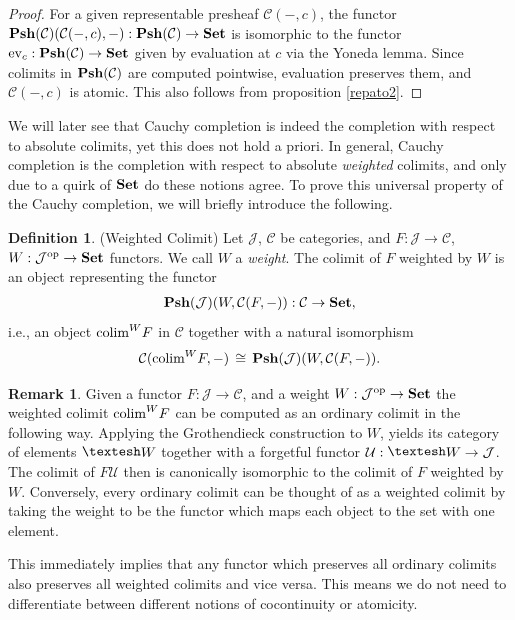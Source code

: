 \documentclass[12pt,oneside,reqno,a4paper]{article}
\theoremstyle{definition}
\newtheorem{definition}[theorem]{Definition}
\newtheorem{remark}[theorem]{Remark}
\newcommand{\esh}{\textup{\raisebox{1pt}\textesh}}
\newcommand{\op}{^\textup{op}}
\newcommand{\Set}{\textbf{\textup{Set}}}
\newcommand{\Psh}[1]{\textbf{\textup{Psh}}(#1)}
\newcommand{\iso}{\,\cong\,}
\newcommand{\C}{\mathcal{C}}
\newcommand{\J}{\mathcal{J}}
\newcommand{\U}{\mathcal{U}}
\newcommand{\colim}{\textup{colim}}
\begin{document}
\begin{proof}
For a given representable presheaf $\C(-,c)$, the functor $\Psh{\C}(\C(-,c),-):\Psh{\C}\to\Set$ is isomorphic to the functor $\textup{ev}_c:\Psh{\C}\to\Set$ given by evaluation at $c$ via the Yoneda lemma. Since colimits in $\Psh{\C}$ are computed pointwise, evaluation preserves them, and $\C(-,c)$ is atomic. This also follows from proposition \ref{repato2}.
\end{proof}

We will later see that Cauchy completion is indeed the completion with respect to absolute colimits, yet this does not hold a priori. In general, Cauchy completion is the completion with respect to absolute \textit{weighted} colimits, and only due to a quirk of $\Set$ do these notions agree. To prove this universal property of the Cauchy completion, we will briefly introduce the following.

\begin{definition}{(Weighted Colimit)}
Let $\J$, $\C$ be categories, and $F:\J\to\C$, $W:\J\op\to\Set$ functors. We call $W$ a \textit{weight}. The colimit of $F$ weighted by $W$ is an object representing the functor
\begin{align*}
\Psh{\J}(W,\C(F,-)): \C\to\Set,
\end{align*}
i.e., an object $\colim^W F$ in $\C$ together with a natural isomorphism 
\begin{align*}
\C(\colim^W F,-)\iso\Psh{\J}(W,\C(F,-)).
\end{align*}
\end{definition}

\begin{remark}
Given a functor $F:\J\to\C$, and a weight $W:\J\op\to\Set$ the weighted colimit $\colim^W F$ can be computed as an ordinary colimit in the following way. Applying the Grothendieck construction to $W$, yields its category of elements $\esh W$ together with a forgetful functor $\U:\esh W \to \J$. The colimit of $F \U$ then is canonically isomorphic to the colimit of $F$ weighted by $W$. Conversely, every ordinary colimit can be thought of as a weighted colimit by taking the weight to be the functor which maps each object to the set with one element.

This immediately implies that any functor which preserves all ordinary colimits also preserves all weighted colimits and vice versa. This means we do not need to differentiate between different notions of cocontinuity or atomicity.
\end{remark}
\end{document}
